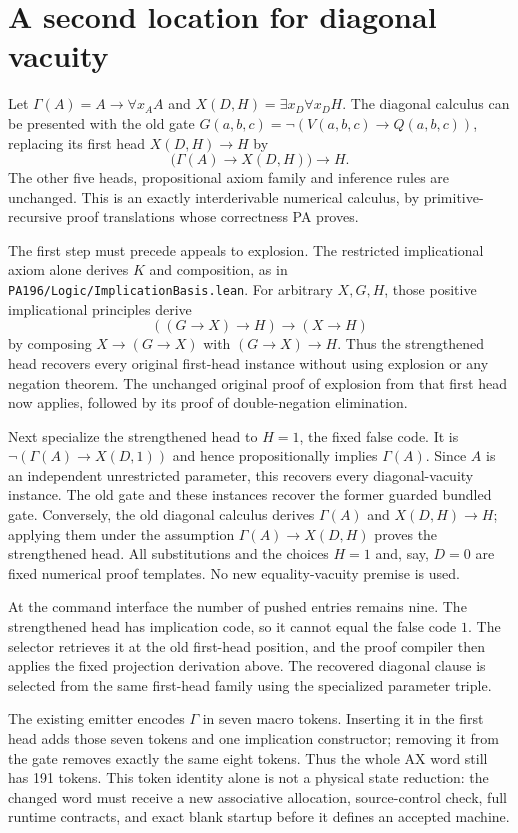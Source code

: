 \section{A second location for diagonal vacuity}
Let $\Gamma(A)=A\to\forall x_A A$ and
$X(D,H)=\exists x_D\forall x_D H$.
The diagonal calculus can be presented with the old gate
$G(a,b,c)=\neg(V(a,b,c)\to Q(a,b,c))$, replacing its first head
$X(D,H)\to H$ by
\[
  \bigl(\Gamma(A)\to X(D,H)\bigr)\to H.
\]
The other five heads, propositional axiom family and inference rules are
unchanged. This is an exactly interderivable numerical calculus, by
primitive-recursive proof translations whose correctness PA proves.

The first step must precede appeals to explosion. The restricted
implicational axiom alone derives $K$ and composition, as in
\texttt{PA196/Logic/ImplicationBasis.lean}. For arbitrary $X,G,H$, those
positive implicational principles derive
\[
 ((G\to X)\to H)\to(X\to H)
\]
by composing $X\to(G\to X)$ with $(G\to X)\to H$.
Thus the strengthened head recovers every original first-head instance
without using explosion or any negation theorem. The unchanged original
proof of explosion from that first head now applies, followed by its
proof of double-negation elimination.

Next specialize the strengthened head to $H=1$, the fixed false code.
It is $\neg(\Gamma(A)\to X(D,1))$ and hence propositionally implies
$\Gamma(A)$. Since $A$ is an independent unrestricted parameter, this
recovers every diagonal-vacuity instance. The old gate and these instances
recover the former guarded bundled gate. Conversely, the old diagonal
calculus derives $\Gamma(A)$ and $X(D,H)\to H$; applying them under the
assumption $\Gamma(A)\to X(D,H)$ proves the strengthened head.
All substitutions and the choices $H=1$ and, say, $D=0$ are fixed numerical
proof templates. No new equality-vacuity premise is used.

At the command interface the number of pushed entries remains nine.
The strengthened head has implication code, so it cannot equal the false
code $1$. The selector retrieves it at the old first-head position, and
the proof compiler then applies the fixed projection derivation above.
The recovered diagonal clause is selected from the same first-head family
using the specialized parameter triple.

The existing emitter encodes $\Gamma$ in seven macro tokens. Inserting it
in the first head adds those seven tokens and one implication constructor;
removing it from the gate removes exactly the same eight tokens. Thus the
whole AX word still has 191 tokens. This token identity alone is not a
physical state reduction: the changed word must receive a new associative
allocation, source-control check, full runtime contracts, and exact blank
startup before it defines an accepted machine.
